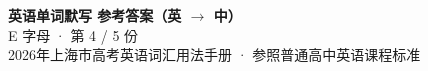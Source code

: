 \documentclass[10pt,a4paper]{article}
\begin{document}
\pagestyle{plain}

\begin{center}
{\LARGE\bfseries 英语单词默写 \quad 参考答案（英 $\to$ 中）}\\[0.22em]
{\large E 字母 · 第 4 / 5 份}\\[0.18em]
{\small 2026年上海市高考英语词汇用法手册 · 参照普通高中英语课程标准}
\end{center}

\vspace{0.2em}
\noindent{\color{rulegray}\rule{\textwidth}{0.8pt}}

\vspace{0.35em}

\vspace{0.25em}
\renewcommand{\arraystretch}{1.32}
\end{document}
